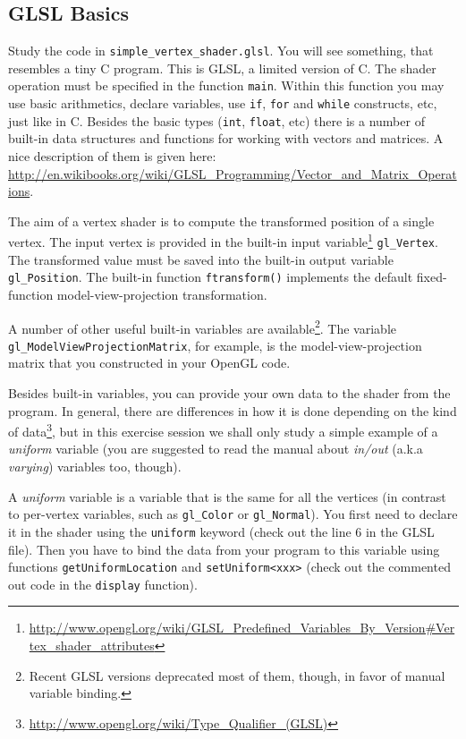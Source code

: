 \documentclass{article}
\begin{document}
\subsection*{GLSL Basics}
Study the code in \verb#simple_vertex_shader.glsl#. You will see something, that resembles a tiny C program. This is GLSL, a limited version of C. The shader operation must be specified in the function \verb#main#. Within this function you may use basic arithmetics, declare variables, use \texttt{if}, \texttt{for} and \texttt{while} constructs, etc, just like in C. Besides the basic types (\texttt{int}, \texttt{float}, etc) there is a number of built-in data structures and functions for working with vectors and matrices. A nice description of them is given here: \url{http://en.wikibooks.org/wiki/GLSL_Programming/Vector_and_Matrix_Operations}.

The aim of a vertex shader is to compute the transformed position of a single vertex. The input vertex is provided in the built-in input variable\footnote{\url{http://www.opengl.org/wiki/GLSL_Predefined_Variables_By_Version\#Vertex_shader_attributes}} \verb#gl_Vertex#. The transformed value must be saved into the built-in output variable \verb#gl_Position#. The built-in function \verb#ftransform()# implements the default fixed-function model-view-projection transformation.

A number of other useful built-in variables are available\footnote{Recent GLSL versions deprecated most of them, though, in favor of manual variable binding.}. The variable\\ \verb#gl_ModelViewProjectionMatrix#, for example, is the model-view-projection matrix that you constructed in your OpenGL code.

Besides built-in variables, you can provide your own data to the shader from the program. In general, there are differences in how it is done depending on the kind of data\footnote{\url{http://www.opengl.org/wiki/Type_Qualifier_(GLSL)}}, but in this exercise session we shall only study a simple example of a \emph{uniform} variable (you are suggested to read the manual about \emph{in/out} (a.k.a \emph{varying}) variables too, though).

A \emph{uniform} variable is a variable that is the same for all the vertices (in contrast to per-vertex variables, such as \verb#gl_Color# or \verb#gl_Normal#). You first need to declare it in the shader using the \texttt{uniform} keyword (check out the line 6 in the GLSL file). Then you have to bind the data from your program to this variable using functions \texttt{getUniformLocation} and \texttt{setUniform<xxx>} (check out the commented out code in the \texttt{display} function).
\end{document}
